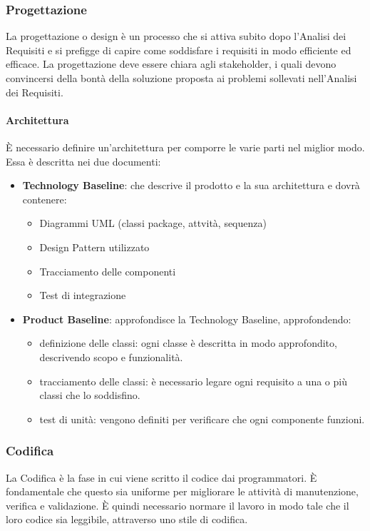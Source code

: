 \subsubsection{Progettazione}
La progettazione o design è un processo che si attiva subito dopo l'Analisi dei Requisiti e si prefigge di capire come soddisfare i requisiti in modo efficiente ed efficace. La progettazione deve essere chiara agli stakeholder\glo, i quali devono convincersi della bontà della soluzione proposta ai problemi sollevati nell'Analisi dei Requisiti.
\paragraph{Architettura}
È necessario definire un'architettura per comporre le varie parti nel miglior modo. Essa è descritta nei due documenti:
\begin{itemize}
  \item \textbf{Technology Baseline}: che descrive il prodotto e la sua architettura e dovrà contenere:
  \begin{itemize}
    \item Diagrammi UML (classi package, attvità, sequenza)
    \item Design Pattern utilizzato
    \item Tracciamento delle componenti
    \item Test di integrazione
  \end{itemize}
  \item \textbf{Product Baseline}: approfondisce la Technology Baseline, approfondendo:
  \begin{itemize}
    \item definizione delle classi: ogni classe è descritta in modo approfondito, descrivendo scopo e funzionalità.
    \item tracciamento delle classi: è necessario legare ogni requisito a una o più classi che lo soddisfino.
    \item test di unità: vengono definiti per verificare che ogni componente funzioni.
  \end{itemize}
\end{itemize}
\subsubsection{Codifica}
La Codifica è la fase in cui viene scritto il codice dai programmatori. È fondamentale che questo sia uniforme per migliorare le attività di manutenzione, verifica e validazione. È quindi necessario normare il lavoro in modo tale che il loro codice sia leggibile, attraverso uno stile di codifica.
